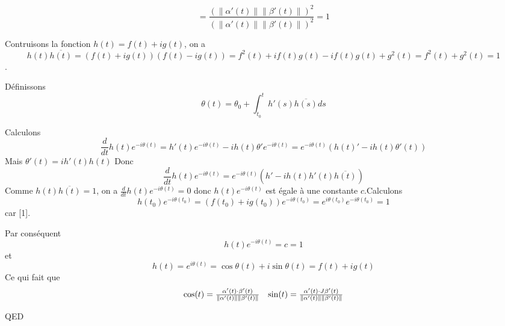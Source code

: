 \documentclass[]{book}
\theoremstyle{definition}
\begin{document}
$$
= \frac{\left( \lVert \alpha'(t) \rVert \lVert \beta'(t) \lVert \right)^2}{\left( \lVert \alpha'(t) \rVert \lVert \beta'(t) \lVert \right)^2} = 1
$$

Contruisons la fonction $h(t) = f(t) + ig(t)$, on a 
$$h(t)\overline{h(t)} = (f(t) + ig(t))(f(t)-ig(t)) = f^2(t) + if(t)g(t) - if(t)g(t) + g^2(t) = f^2(t) + g^2(t) = 1$$.

D\'efinissons
$$
\theta(t) = \theta_0 + \int_{t_0}^th'(s)\overline{h(s)}ds
$$

Calculons 
$$\frac{d}{dt}h(t)e^{-i\theta(t)} = h'(t)e^{-i\theta(t)} - ih(t)\theta'e^{-i\theta(t)} = e^{-i\theta(t)}(h(t)'-ih(t)\theta'(t))$$
Mais $\theta'(t) = ih'(t)h(t)$
Donc
$$\frac{d}{dt}h(t)e^{-i\theta(t)} = e^{-i\theta(t)}(h'-ih(t)h'(t)\overline{h(t)})$$
Comme $h(t)\overline{h(t)} = 1$, on a $\frac{d}{dt}h(t)e^{-i\theta(t)} = 0$ donc $h(t)e^{-i\theta(t)}$ est \'egale \`a une constante $c$.Calculons
$$
h(t_0)e^{-i\theta(t_0)} = (f(t_0) + ig(t_0))e^{-i\theta(t_0)} = e^{i\theta(t_0)}e^{-i\theta(t_0)} = 1
$$
car [1].

Par cons\'equent 
$$
h(t)e^{-i\theta(t)} = c = 1
$$
et
$$
h(t)= e^{i\theta(t)} = \cos \theta(t) + i \sin \theta(t) = f(t) + ig(t)
$$
Ce qui fait que 
$$
\begin{array}{l l}
\cos(t) = \frac{\alpha'(t) \cdot \beta'(t)}{\lVert \alpha'(t) \rVert \lVert \beta'(t) \lVert} & \sin(t) = \frac{\alpha'(t) \cdot J\beta'(t)}{\lVert \alpha'(t) \rVert \lVert \beta'(t) \lVert}
\end{array}
$$


QED
\end{document}
